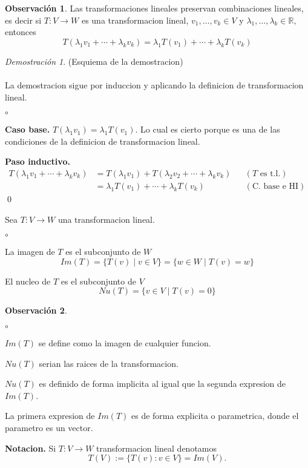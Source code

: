 \documentclass{article}
\theoremstyle{definition}
\theoremstyle{definition}
\newtheorem*{obs}{Observación}
\theoremstyle{remark}
\newtheorem*{demo}{Demostración}
\begin{document}
\begin{obs}
Las transformaciones lineales preservan combinaciones lineales, es decir si $T : V \to W$ es una transformacion lineal, $v_1, \dots ,v_k \in V$ y \mbox{$\lambda_1, \dots ,\lambda_k \in \mathbb{R},$} entonces \[
T(\lambda_1 v_1 + \cdots + \lambda_k v_k )= \lambda_1 T(v_1) + \cdots + \lambda_k T(v_k)
  \]
  \begin{demo}
    (Esquiema de la demostracion) \\\\ La demostracion sigue por induccion y aplicando la definicion de transformacion lineal. \begin{list}{$\circ$}{}  
    \item  \textbf{Caso base.} $T(\lambda_1 v_1) =\lambda_1 T(v_1)$. Lo cual es cierto porque es una de las condiciones de la definicion de transformacion lineal. 
    \item \textbf{Paso inductivo.} \[
        \begin{aligned}
          T(\lambda_1v_1+ \cdots + \lambda_k v_k)&= T(\lambda_1 v_1 ) + T(\lambda_2 v_2 + \cdots + \lambda_k v_k) && (T \text{ es t.l.}) \\
                                                &= \lambda_1 T (v_1 ) + \cdots + \lambda_k T(v_k) && (\text{C. base e HI})
        \end{aligned}
      \]
      \qed
\end{list}
  \end{demo}
\end{obs}
\begin{defi}
  Sea $T : V \to W$ una transformacion lineal. 
\begin{list}{$\circ$}{}  
\item La imagen de $T$ es el subconjunto de $W$ \[
    Im(T)=\{T(v) \; | \; v \in V\}=\{w \in W \; | \; T(v) = w\}
  \]
\item El nucleo de $T$ es el subconjunto de $V$ \[
    Nu(T)=\{v \in V \; | \; T(v) = 0\}
  \]
\end{list}
\end{defi}
\begin{obs} \;
\begin{list}{$\circ$}{}  
\item  $Im(T)$ se define como la imagen de cualquier funcion.
\item $Nu(T)$ serian las raices de la transformacion. 
\item $Nu(T)$ es definido de forma implicita al igual que la segunda expresion de $Im(T)$. 
\item La primera expresion de $Im(T)$ es de forma explicita o parametrica, donde el parametro es un vector.
\end{list}
\textbf{Notacion.} Si $T : V \to W$ transformacion lineal denotamos 
\[
  T(V):=\{T(v): v \in V \}= Im(V).
\]
\end{obs}
\end{document}
